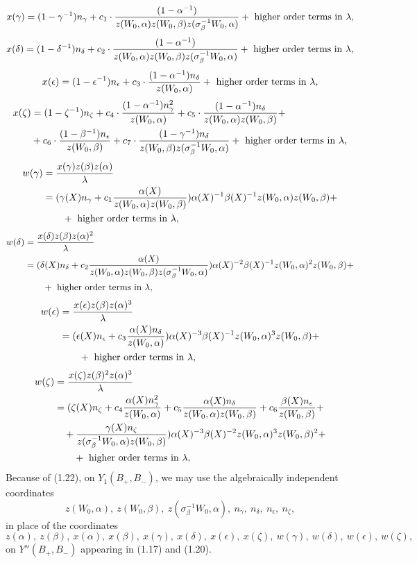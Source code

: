 $$
x(\gamma)=(1-\gamma^{-1})n_\gamma +
c_1\cdot {(1-\alpha^{-1})
\over{z(W_0,\alpha)z(W_0,\beta)z(\sigma_\beta^{-1}W_0,\alpha)}}
+\text{ higher order terms in }\lambda,
$$
$$
x(\delta)=(1-\delta^{-1})n_\delta +
c_2\cdot {(1-\alpha^{-1})
\over{z(W_0,\alpha)z(W_0,\beta)z(\sigma_\beta^{-1}W_0,\alpha)}}
+\text{ higher order terms in }\lambda,
$$
$$
x(\epsilon)=(1-\epsilon^{-1})n_\epsilon +
c_3\cdot {(1-\alpha^{-1})n_\delta
\over{z(W_0,\alpha)}}
+\text{ higher order terms in }\lambda,
$$
$$
\split
x(\zeta)
&=(1-\zeta^{-1})n_\zeta +
c_4\cdot {(1-\alpha^{-1})n_\gamma^2
\over{z(W_0,\alpha)}}+
c_5\cdot {(1-\alpha^{-1})n_\delta
\over{z(W_0,\alpha)z(W_0,\beta)}}+\\
&+c_6\cdot {(1-\beta^{-1})n_\epsilon
\over{z(W_0,\beta)}}+
c_7\cdot {(1-\gamma^{-1})n_\delta
\over{z(W_0,\beta)z(\sigma_\beta^{-1}W_0,\alpha)}}
+\text{ higher order terms in }\lambda,
\endsplit
$$
$$
\split
w(\gamma)
&={x(\gamma)z(\beta)z(\alpha)\over \lambda}\\
&=(\gamma(X)n_\gamma + c_1{\alpha(X)\over{z(W_0,\alpha)z(W_0,\beta)}})
\alpha(X)^{-1}\beta(X)^{-1}z(W_0,\alpha)z(W_0,\beta)+\\
&\quad\quad +\text{ higher order terms in }\lambda,
\endsplit
$$
$$
\split
w(\delta)
&={x(\delta)z(\beta)z(\alpha)^2\over \lambda}\\
&=(\delta(X)n_\delta +
c_2{\alpha(X)\over{z(W_0,\alpha)z(W_0,\beta)z(\sigma_\beta^{-1}W_0,\alpha)}})
\alpha(X)^{-2}\beta(X)^{-1}z(W_0,\alpha)^2z(W_0,\beta)+\\
&\quad\quad +\text{ higher order terms in }\lambda,
\endsplit
$$
$$
\split
w(\epsilon)
&={x(\epsilon)z(\beta)z(\alpha)^3\over \lambda}\\
&=(\epsilon(X)n_\epsilon + c_3{\alpha(X)n_\delta\over{z(W_0,\alpha)}})
\alpha(X)^{-3}\beta(X)^{-1}z(W_0,\alpha)^3z(W_0,\beta)+\\
&\quad\quad +\text{ higher order terms in }\lambda,
\endsplit
$$
$$
\split
w(\zeta)
&={x(\zeta)z(\beta)^2z(\alpha)^3\over \lambda}\\
&=(\zeta(X)n_\zeta + c_4{\alpha(X)n_\gamma^2\over{z(W_0,\alpha)}}
+c_5{\alpha(X)n_\delta\over{z(W_0,\alpha)z(W_0,\beta)}}
+c_6{\beta(X)n_\epsilon\over{z(W_0,\beta)}}+\\
&\quad +{\gamma(X)n_\zeta\over{z(\sigma_\beta^{-1}W_0,\alpha)z(W_0,\beta)}})
\alpha(X)^{-3}\beta(X)^{-2}z(W_0,\alpha)^3z(W_0,\beta)^2+\\
&\quad\quad +\text{ higher order terms in }\lambda,
\endsplit
$$
Because of (1.22), on $Y_1(B_+,B_-)$, we may
use the algebraically independent coordinates
$$
z(W_0,\alpha),\ z(W_0,\beta),\ z(\sigma_\beta^{-1}W_0,\alpha),\
n_\gamma,\ n_\delta,\ n_\epsilon,\ n_\zeta,
$$
in place of the coordinates
$$
z(\alpha),\ z(\beta),\ x(\alpha),\ x(\beta),\ x(\gamma),\
x(\delta),\ x(\epsilon),\ x(\zeta),\
w(\gamma),\ w(\delta),\ w(\epsilon),\ w(\zeta),
$$
on $Y''(B_+,B_-)$ appearing in (1.17) and (1.20).

\enddocument
